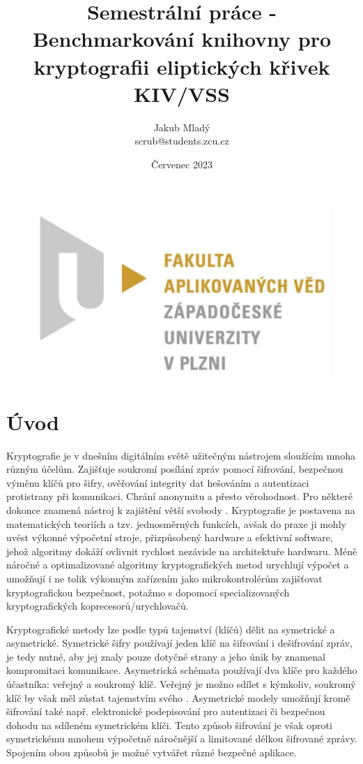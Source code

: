 \documentclass{article}
\title{%
Semestrální práce - Benchmarkování knihovny pro kryptografii eliptických křivek \\
\large KIV/VSS
}
\author{Jakub Mladý \\ scrub@students.zcu.cz}
\date{Červenec 2023}
\theoremstyle{definition}
\begin{document}
\begin{titlingpage}
\begin{figure}
    \includegraphics[scale=0.5]{fav_logo}
\end{figure}

\maketitle
\end{titlingpage}
\tableofcontents
\newpage

\section{Úvod}
Kryptografie je v dnešním digitálním světě užitečným nástrojem sloužícím mnoha různým účelům. Zajišťuje soukromí posílání zpráv pomocí šifrování, bezpečnou výměnu klíčů pro šifry, ověřování integrity dat hešováním a autentizaci protistrany při komunikaci. Chrání anonymitu a přesto věrohodnost. Pro některé dokonce znamená nástroj k zajištění větší svobody \cite{cyphernomicon}. Kryptografie je postavena na matematických teoriích a tzv. jednosměrných funkcích, avšak do praxe ji mohly uvést výkonné výpočetní stroje, přizpůsobený hardware a efektivní software, jehož algoritmy dokáží ovlivnit rychlost nezávisle na architektuře hardwaru. Méně náročné a optimalizované algoritmy kryptografických metod urychlují výpočet a umožňují i ne tolik výkonným zařízením jako mikrokontrolérům zajišťovat kryptografickou bezpečnost, potažmo s dopomocí specializovaných kryptografických koprecesorů/urychlovačů.

Kryptografické metody lze podle typů tajemství (klíčů) dělit na symetrické a asymetrické. Symetrické šifry používají jeden klíč na šifrování i dešifrování zpráv, je tedy nutné, aby jej znaly pouze dotyčné strany a jeho únik by znamenal kompromitaci komunikace. Asymetrická schémata používají dva klíče pro každého účastníka: veřejný a soukromý klíč. Veřejný je možno sdílet s kýmkoliv, soukromý klíč by však měl zůstat tajemstvím svého . Asymetrické modely umožňují kromě šifrování také např. elektronické podepisování pro autentizaci či bezpečnou dohodu na sdíleném symetrickém klíči. Tento způsob šifrování je však oproti symetrickému mnohem výpočetně náročnější a limitované délkou šifrované zprávy. Spojením obou způsobů je možné vytvářet různé bezpečné aplikace. 
\end{document}
